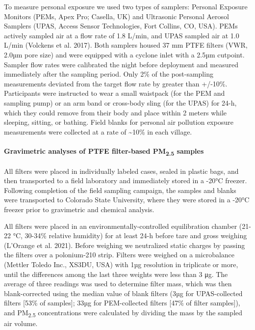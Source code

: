 \documentclass[
  letterpaper,
  DIV=11,
  numbers=noendperiod]{scrartcl}
\let\oldparagraph\paragraph
\renewcommand{\paragraph}[1]{\oldparagraph{#1}\mbox{}}
\providecommand{\DIFaddbegin}{} %
\providecommand{\DIFaddend}{} %
\providecommand{\DIFdelbegin}{} %
\providecommand{\DIFdelend}{} %
\newcommand{\DIFscaledelfig}{0.5}
\newlength{\DIFdelgraphicswidth} %
\newlength{\DIFdelgraphicsheight} %
\newcommand{\DIFaddincludegraphics}[2][]{{\color{blue}\fbox{\DIFOincludegraphics[#1]{#2}}}} %
\newcommand{\DIFdelincludegraphics}[2][]{%
\sbox{\DIFdelgraphicsbox}{\DIFOincludegraphics[#1]{#2}}%
\settoboxwidth{\DIFdelgraphicswidth}{\DIFdelgraphicsbox} %
\settoboxtotalheight{\DIFdelgraphicsheight}{\DIFdelgraphicsbox} %
\scalebox{\DIFscaledelfig}{%
\parbox[b]{\DIFdelgraphicswidth}{\usebox{\DIFdelgraphicsbox}\\[-\baselineskip] \rule{\DIFdelgraphicswidth}{0em}}\llap{\resizebox{\DIFdelgraphicswidth}{\DIFdelgraphicsheight}{%
\setlength{\unitlength}{\DIFdelgraphicswidth}%
\begin{picture}(1,1)%
\thicklines\linethickness{2pt} %
{\color[rgb]{1,0,0}\put(0,0){\framebox(1,1){}}}%
{\color[rgb]{1,0,0}\put(0,0){\line( 1,1){1}}}%
{\color[rgb]{1,0,0}\put(0,1){\line(1,-1){1}}}%
\end{picture}%
}\hspace*{3pt}}} %
} %
\DeclareRobustCommand{\DIFaddbegin}{\DIFOaddbegin \let\includegraphics\DIFaddincludegraphics} %
\DeclareRobustCommand{\DIFaddend}{\DIFOaddend \let\includegraphics\DIFOincludegraphics} %
\DeclareRobustCommand{\DIFdelbegin}{\DIFOdelbegin \let\includegraphics\DIFdelincludegraphics} %
\DeclareRobustCommand{\DIFdelend}{\DIFOaddend \let\includegraphics\DIFOincludegraphics} %
\begin{document}
To measure personal exposure we used two types of samplers: Personal
Exposure Monitors (PEMs, Apex Pro; Casella, UK) and Ultrasonic Personal
Aerosol Samplers (UPAS, Access Sensor Technologies, Fort Collins, CO,
USA). PEMs actively sampled air at a flow rate of 1.8 L/min, and UPAS
sampled air at 1.0 L/min (Volckens et al. 2017). Both samplers housed 37
mm PTFE filters (VWR, 2.0µm pore size) and were equipped with a cyclone
inlet with a 2.5µm cutpoint. Sampler flow rates were calibrated the
night before deployment and measured immediately after the sampling
period. Only 2\% of the post-sampling measurements deviated from the
target flow rate by greater than +/-10\%. Participants were instructed
to wear a small waistpack (for the PEM and sampling pump) or an arm band
or cross-body sling (for the UPAS) for 24-h, which they could remove
from their body and place within 2 meters while sleeping, sitting, or
bathing. Field blanks for personal air pollution exposure measurements
were collected at a rate of \textasciitilde10\% in each village.

\DIFdelbegin %
\DIFdelend \DIFaddbegin \paragraph{\texorpdfstring{Gravimetric analyses of PTFE filter-based
PM\textsubscript{2.5}
samples}{Gravimetric analyses of PTFE filter-based PM2.5 samples}}\label{gravimetric-analyses-of-ptfe-filter-based-pm2.5-samples}
\DIFaddend 

All filters were placed in individually labeled cases, sealed in plastic
bags, and then transported to a field laboratory and immediately stored
in a -20°C freezer. Following completion of the field sampling campaign,
the samples and blanks were transported to Colorado State University,
where they were stored in a -20°C freezer prior to gravimetric and
chemical analysis.

All filters were placed in an environmentally-controlled equilibration
chamber (21-22 °C, 30-34\% relative humidity) for at least 24-h before
tare and gross weighing (L'Orange et al. 2021). Before weighing we
neutralized static charges by passing the filters over a polonium-210
strip. Filters were weighed on a microbalance (Mettler Toledo Inc.,
XS3DU, USA) with 1µg resolution in triplicate or more, until the
differences among the last three weights were less than 3 μg. The
average of three readings was used to determine filter mass, which was
then blank-corrected using the median value of blank filters (3µg for
UPAS-collected filters {[}53\% of samples{]}; 33µg for PEM-collected
filters {[}47\% of filter samples{]}), and PM\textsubscript{2.5}
concentrations were calculated by dividing the mass by the sampled air
volume.
\end{document}

